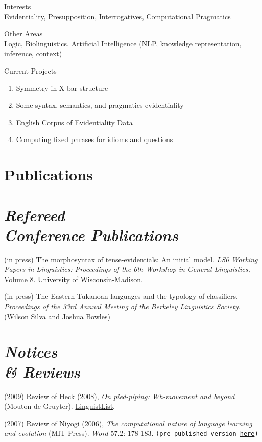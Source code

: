 \documentclass[margin,line]{resume}
\begin{document}
\begin{resume}
{\sc Interests}\\ 
Evidentiality, Presupposition, Interrogatives, Computational Pragmatics

{\sc Other Areas}\\
Logic, Biolinguistics, Artificial Intelligence (NLP, knowledge representation, inference, context)
 
{\sc Current Projects}
\begin{enumerate} 
 \item Symmetry in X-bar structure
 \item Some syntax, semantics, and pragmatics evidentiality
\item English Corpus of Evidentiality Data
\item Computing fixed phrases for idioms and questions
 \end{enumerate} 


\section{Publications}

\section{{\sl Refereed\\ Conference Publications}}
(in press) The morphosyntax of tense-evidentials: An initial model. \emph{\href{http://ling.wisc.edu/lso/wpl-main.html}{LS0} Working Papers in Linguistics: Proceedings of the 6th Workshop in General Linguistics,} Volume 8. University of Wisconsin-Madison.

(in press) The Eastern Tukanoan languages and the typology of classifiers. \emph{Proceedings of the 33rd
Annual Meeting of the \href{http://linguistics.berkeley.edu/BLS/past_meetings.html}{Berkeley Linguistics Society.}} (Wilson Silva and Joshua Bowles)


\section{{\sl Notices\\ \& Reviews}}
(2009) Review of Heck (2008), \emph{On pied-piping: Wh-movement and beyond} (Mouton de
Gruyter). \href{http://linguistlist.org/issues/20/20-2283.html}{LinguistList}.

(2007) Review of Niyogi (2006), \emph{The computational nature of language learning and evolution} (MIT Press). {\it Word} 57.2: 178-183. \texttt{(pre-published version \href{http://sites.google.com/site/bowleslinguistics/Home/research/teaching-1/publications}{here})}


\end{resume}
\end{document}
